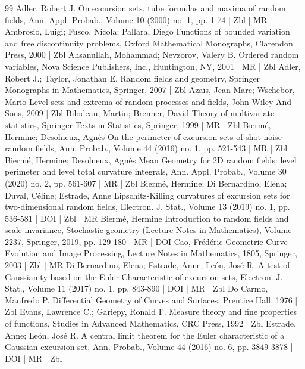 \begin{thebibliography}{99}
Adler, Robert J. On excursion sets, tube formulas and maxima of random fields, Ann. Appl. Probab., Volume 10 (2000) no. 1, pp. 1-74 | Zbl | MR
Ambrosio, Luigi; Fusco, Nicola; Pallara, Diego Functions of bounded variation and free discontinuity problems, Oxford Mathematical Monographs, Clarendon Press, 2000 | Zbl
Ahsanullah, Mohammad; Nevzorov, Valery B. Ordered random variables, Nova Science Publishers, Inc., Huntington, NY, 2001 | MR | Zbl
Adler, Robert J.; Taylor, Jonathan E. Random fields and geometry, Springer Monographs in Mathematics, Springer, 2007 | Zbl
Azaïs, Jean-Marc; Wschebor, Mario Level sets and extrema of random processes and fields, John Wiley And Sons, 2009 | Zbl
Bilodeau, Martin; Brenner, David Theory of multivariate statistics, Springer Texts in Statistics, Springer, 1999 | MR | Zbl
Biermé, Hermine; Desolneux, Agnès On the perimeter of excursion sets of shot noise random fields, Ann. Probab., Volume 44 (2016) no. 1, pp. 521-543 | MR | Zbl
Biermé, Hermine; Desolneux, Agnès Mean Geometry for 2D random fields: level perimeter and level total curvature integrals, Ann. Appl. Probab., Volume 30 (2020) no. 2, pp. 561-607 | MR | Zbl
Biermé, Hermine; Di Bernardino, Elena; Duval, Céline; Estrade, Anne Lipschitz-Killing curvatures of excursion sets for two-dimensional random fields, Electron. J. Stat., Volume 13 (2019) no. 1, pp. 536-581 | DOI | Zbl | MR
Biermé, Hermine Introduction to random fields and scale invariance, Stochastic geometry (Lecture Notes in Mathematics), Volume 2237, Springer, 2019, pp. 129-180 | MR | DOI
Cao, Frédéric Geometric Curve Evolution and Image Processing, Lecture Notes in Mathematics, 1805, Springer, 2003 | Zbl | MR
Di Bernardino, Elena; Estrade, Anne; León, José R. A test of Gaussianity based on the Euler Characteristic of excursion sets, Electron. J. Stat., Volume 11 (2017) no. 1, pp. 843-890 | DOI | MR | Zbl
Do Carmo, Manfredo P. Differential Geometry of Curves and Surfaces, Prentice Hall, 1976 | Zbl
Evans, Lawrence C.; Gariepy, Ronald F. Measure theory and fine properties of functions, Studies in Advanced Mathematics, CRC Press, 1992 | Zbl
Estrade, Anne; León, José R. A central limit theorem for the Euler characteristic of a Gaussian excursion set, Ann. Probab., Volume 44 (2016) no. 6, pp. 3849-3878 | DOI | MR | Zbl

\end{thebibliography}
